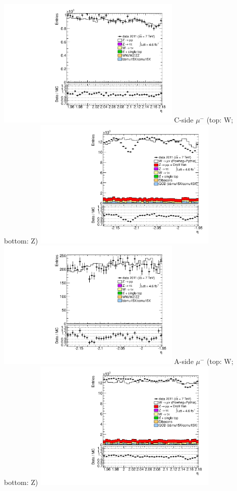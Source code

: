 {\includegraphics[width=0.66\textwidth]{dates/20130306/figures/both/Z_10_A_stack_lP_eta_ALL.pdf} 
\cole
}
 {
\colb[T]
C-side $\mu^{-}$ (top: W; bottom: Z)
\centering
\includegraphics[width=0.66\textwidth]{dates/20130306/figures/both/W_10_C_stack_l_eta_POS} \\
\includegraphics[width=0.66\textwidth]{dates/20130306/figures/both/Ztinv_10_C_stack_lP_eta_ALL.pdf}
A-side $\mu^{-}$ (top: W; bottom: Z)
\centering
\includegraphics[width=0.66\textwidth]{dates/20130306/figures/both/W_10_A_stack_l_eta_POS} \\
}
